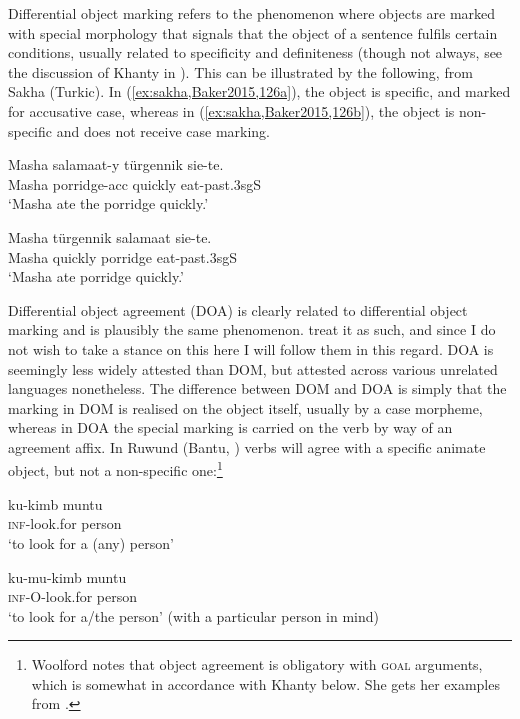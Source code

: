 \documentclass[output=paper
,modfonts
,nonflat]{langsci/langscibook}
\begin{document}
Differential object marking refers to the phenomenon where objects are mark\-ed with special morphology that signals that the object of a sentence fulfils certain conditions, usually related to specificity and definiteness (though not always, see the discussion of Khanty in ).
This can be illustrated by the following, from Sakha (Turkic).
In (\ref{ex:sakha,Baker2015,126a}), the object is specific, and marked for accusative case, whereas in (\ref{ex:sakha,Baker2015,126b}), the object is non-specific and does not receive case marking.

\begin{exe}
  \ex {}\label{ex:sakha,Baker2015,126}
\begin{xlist}
\ex
\gll Masha salamaat-y türgennik sie-te.\\
Masha porridge-{\sc acc} quickly eat-{\sc past.3sgS}\\
\glt `Masha ate the porridge quickly.'  \label{ex:sakha,Baker2015,126a}

\ex
\gll Masha türgennik salamaat sie-te.\\
Masha quickly porridge eat-{\sc past.3sgS}\\
\glt `Masha ate porridge quickly.' \label{ex:sakha,Baker2015,126b}
\end{xlist}
\end{exe}


\noindent Differential object agreement (DOA) is clearly related to differential object marking and is plausibly the same phenomenon.
\citeauthor{dn2011} treat it as such, and since I do not wish to take a stance on this here I will follow them in this regard. 
DOA is seemingly less widely attested than DOM, but attested across various unrelated languages nonetheless. 
The difference between DOM and DOA is simply that the marking in DOM is realised on the object itself, usually by a case morpheme, whereas in DOA the special marking is carried on the verb by way of an agreement affix. 
In Ruwund (Bantu, \citealt{woolford2001}) verbs will agree with a specific animate object, but not a non-specific one:\footnote{Woolford notes that object agreement is obligatory with \textsc{goal} arguments, which is somewhat in accordance with Khanty below.
She gets her examples from \citet[][565]{nash1992}.}

\begin{exe}
\ex {}\label{ex:ruwund}
\begin{xlist}
\ex
{\gll ku-kimb muntu\\
\textsc{inf}-look.for person\\
\glt `to look for a (any) person'} \label{ex:ruwunda}

\ex
{\gll ku-mu-kimb muntu\\
\textsc{inf-O}-look.for person\\
\glt `to look for a/the person' (with a particular person in mind)}  \label{ex:ruwundb}
\end{xlist}
\end{exe}
\end{document}
